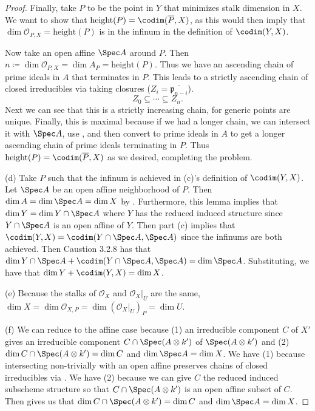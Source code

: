 \begin{proof}
	Finally, take $P $ to be the point in $Y $ that minimizes stalk dimension in $X $.
	We want to show that $\text{height}(P) = \codim(\overline{P},X)  $, as this would then imply that $\dim \mathcal{O}_{P,X} = \text{height}(P) $ is in the infinum in the definition of $\codim(Y,X) $.

	Now take an open affine $\Spec A $ around $P $.
	Then $n\coloneqq \dim \mathcal{O}_{P,X} = \dim A_P = \text{height}(P)$.
	Thus we have an ascending chain of prime ideals in $A $ that terminates in $P $.
	This leads to a strictly ascending chain of closed irreducibles via taking closures ($Z_i = \overline{\mathfrak{p}_{n-i} }$).
	\[
		Z_{0}\subseteq \cdots \subseteq Z_n
	.\]
	Next we can see that this is a strictly increasing chain, for generic points are unique.
	Finally, this is maximal because if we had a longer chain, we can intersect it with $\Spec A $, use , and then convert to prime ideals in $A $ to get a longer ascending chain of prime ideals terminating in $P $.
	Thus $\text{height}(P) = \codim(\overline{P},X)  $ as we desired, completing the problem.

	(d)
	Take $P $ such that the infinum is achieved in (c)'s definition of $\codim(Y,X)$.
	Let $\Spec A $ be an open affine neighborhood of $P $.
	Then $\dim A = \dim \Spec A =\dim X$ by .
	Furthermore, this lemma implies that $\dim Y = \dim Y\cap \Spec A $ where $Y $ has the reduced induced structure since $Y\cap \Spec A $ is an open affine of $Y $.
	Then part (c) implies that $\codim(Y,X) = \codim(Y\cap \Spec A, \Spec A) $ since the infinums are both achieved.
	Then Caustion 3.2.8 has that $\dim Y\cap \Spec A + \codim(Y\cap \Spec A, \Spec A) = \dim \Spec A $.
	Substituting, we have that $\dim Y+ \codim(Y,X) = \dim X $.

	(e) Because the stalks of $\mathcal{O}_X $ and $\mathcal{O}_X\big|_{U} $ are the same, $\dim X = \dim \mathcal{O}_{X,P} = \dim (\mathcal{O}_{X}\big|_{U})_P = \dim U$.

	(f)
	We can reduce to the affine case because (1) an irreducible component $C $ of $X' $ gives an irreducible component $C\cap \Spec (A \otimes k') $ of $\Spec (A \otimes k') $ and (2) $\dim C\cap \Spec (A \otimes k') = \dim C $ and $\dim \Spec A = \dim X $.
	We have (1) because intersecting non-trivially with an open affine preserves chains of closed irreducibles via .
	We have (2) because we can give $C $ the reduced induced subscheme structure so that $C\cap \Spec (A \otimes k') $ is an open affine subset of $C $.
	Then  gives us that $\dim C\cap \Spec (A \otimes k') = \dim C $ and $\dim \Spec A = \dim X $.


\end{proof}
